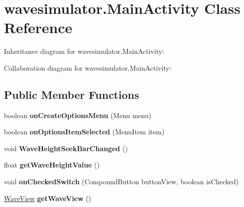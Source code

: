 \hypertarget{classwavesimulator_1_1MainActivity}{}\section{wavesimulator.\+Main\+Activity Class Reference}
\label{classwavesimulator_1_1MainActivity}


Inheritance diagram for wavesimulator.\+Main\+Activity\+:


Collaboration diagram for wavesimulator.\+Main\+Activity\+:
\subsection*{Public Member Functions}
\begin{DoxyCompactItemize}
\item 
\mbox{\label{classwavesimulator_1_1MainActivity_aec42f57753b20a3200ff2d6faefbbfd6}} 
boolean {\bfseries on\+Create\+Options\+Menu} (Menu menu)
\item 
\mbox{\label{classwavesimulator_1_1MainActivity_ac1e77788cf8d6eee4b48ccfec120b414}} 
boolean {\bfseries on\+Options\+Item\+Selected} (Menu\+Item item)
\item 
\mbox{\label{classwavesimulator_1_1MainActivity_ad4717a53e98a2eeb4be677b754169d6d}} 
void {\bfseries Wave\+Height\+Seek\+Bar\+Changed} ()
\item 
\mbox{\label{classwavesimulator_1_1MainActivity_a7b2a54961e6db516c70463c0a5a12e21}} 
float {\bfseries get\+Wave\+Height\+Value} ()
\item 
\mbox{\label{classwavesimulator_1_1MainActivity_aa4b02a928bcf917374e14fa2950f3659}} 
void {\bfseries on\+Checked\+Switch} (Compound\+Button button\+View, boolean is\+Checked)
\item 
\mbox{\label{classwavesimulator_1_1MainActivity_a6f24f2ef94993440a4e7c7df229a0e97}} 
\hyperlink{classwavesimulator_1_1WaveView}{Wave\+View} {\bfseries get\+Wave\+View} ()
\end{DoxyCompactItemize}
